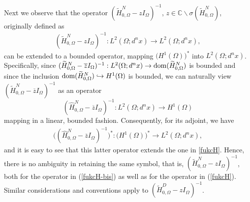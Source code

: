 \documentclass[reqno,10pt, centertags]{amsart}
\newcommand{\bbC}{{\mathbb{C}}}
\newcommand{\ol}{\overline}
\newcommand{\wti}{\widetilde}
\newcommand{\si}{\sigma}
\newcommand{\Om}{\Omega}
\newcommand{\dom}{\text{\rm{dom}}}
\newcommand{\hatt}{\widehat}
\numberwithin{equation}{section}
\theoremstyle{definition}
\begin{document}
Next we observe that the operator $(\wti H^N_{0,\Om}-zI_\Om)^{-1}$,
$z\in\bbC\backslash\si(\wti H^N_{0,\Om})$, originally defined as
\begin{align}\label{fukcH}
(\wti H^N_{0,\Om}-zI_\Om)^{-1}:L^2(\Om;d^nx)\to L^2(\Om;d^nx),
\end{align}
can be extended to a bounded operator, mapping
$\big(H^{1}(\Om)\big)^*$ into $L^2(\Omega;d^nx)$. Specifically,
since $(\wti H^N_{0,\Om}-\ol{z}I_\Om)^{-1}: L^2(\Om;d^nx)
\to \dom(\wti H^N_{0,\Om})$ is bounded and since the inclusion
$\dom(\wti H^N_{0,\Om})\hookrightarrow H^{1}(\Om)$ is bounded, we can
naturally view $(\wti H^N_{0,\Om}-\ol{z}I_\Om)^{-1}$ as an operator
\begin{equation}
(\hatt H^N_{0,\Om}-\ol{z}I_\Om)^{-1} \colon L^2(\Om;d^nx) \to H^1(\Om)
\end{equation}
mapping in a linear, bounded fashion.
Consequently, for its adjoint, we have
\begin{align}\label{fukcH-bis}
\big((\hatt H^N_{0,\Om}-\ol{z}I_\Om)^{-1}\big)^* :
\big(H^{1}(\Om)\big)^* \to L^2(\Om;d^nx),
\end{align}
and it is easy to see that this latter operator extends the one
in \eqref{fukcH}. Hence, there is no ambiguity in retaining
the same symbol, that is, $(\wti H^N_{0,\Om}-zI_\Om)^{-1}$, both
for the operator in (\ref{fukcH-bis}) as well as for the operator
in (\ref{fukcH}). Similar considerations and conventions apply to
$(\wti H^D_{0,\Om}-zI_\Om)^{-1}$.
\end{document}
